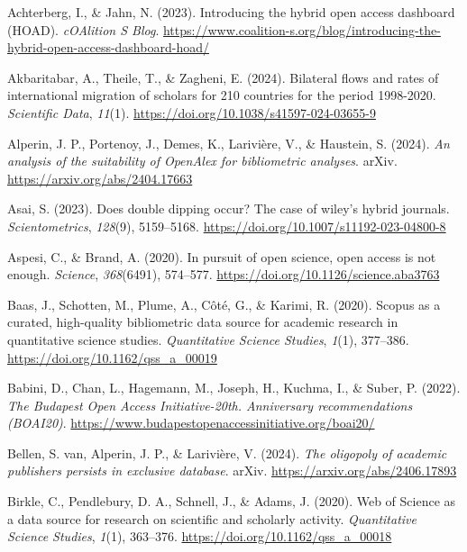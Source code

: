 \documentclass[a4paper,man,floatsintext,longtable,noextraspace,10pt]{apa6}
\newlength{\cslhangindent}
\newenvironment{CSLReferences}[2] %
{\begin{list}{}{%
  \setlength{\itemindent}{0pt}
  \setlength{\leftmargin}{0pt}
  \setlength{\parsep}{0pt}
  \ifodd #1
  \setlength{\leftmargin}{\cslhangindent}
  \setlength{\itemindent}{-1\cslhangindent}
  \fi
  \setlength{\itemsep}{#2\baselineskip}}}
{\end{list}}
\begin{document}
\label{refs}
\begin{CSLReferences}{1}{0}
Achterberg, I., \& Jahn, N. (2023). Introducing the hybrid open access
dashboard (HOAD). \emph{cOAlition S Blog}.
\url{https://www.coalition-s.org/blog/introducing-the-hybrid-open-access-dashboard-hoad/}

Akbaritabar, A., Theile, T., \& Zagheni, E. (2024). Bilateral flows and
rates of international migration of scholars for 210 countries for the
period 1998-2020. \emph{Scientific Data}, \emph{11}(1).
\url{https://doi.org/10.1038/s41597-024-03655-9}

Alperin, J. P., Portenoy, J., Demes, K., Larivière, V., \& Haustein, S.
(2024). \emph{An analysis of the suitability of OpenAlex for
bibliometric analyses}. arXiv. \url{https://arxiv.org/abs/2404.17663}

Asai, S. (2023). Does double dipping occur? The case of wiley's hybrid
journals. \emph{Scientometrics}, \emph{128}(9), 5159--5168.
\url{https://doi.org/10.1007/s11192-023-04800-8}

Aspesi, C., \& Brand, A. (2020). In pursuit of open science, open access
is not enough. \emph{Science}, \emph{368}(6491), 574--577.
\url{https://doi.org/10.1126/science.aba3763}

Baas, J., Schotten, M., Plume, A., Côté, G., \& Karimi, R. (2020).
Scopus as a curated, high-quality bibliometric data source for academic
research in quantitative science studies. \emph{Quantitative Science
Studies}, \emph{1}(1), 377--386.
\url{https://doi.org/10.1162/qss_a_00019}

Babini, D., Chan, L., Hagemann, M., Joseph, H., Kuchma, I., \& Suber, P.
(2022). \emph{{The Budapest Open Access Initiative-20th. Anniversary
recommendations (BOAI20)}}.
\url{https://www.budapestopenaccessinitiative.org/boai20/}

Bellen, S. van, Alperin, J. P., \& Larivière, V. (2024). \emph{The
oligopoly of academic publishers persists in exclusive database}. arXiv.
\url{https://arxiv.org/abs/2406.17893}

Birkle, C., Pendlebury, D. A., Schnell, J., \& Adams, J. (2020). {Web of
Science} as a data source for research on scientific and scholarly
activity. \emph{Quantitative Science Studies}, \emph{1}(1), 363--376.
\url{https://doi.org/10.1162/qss_a_00018}


\end{CSLReferences}
\end{document}
